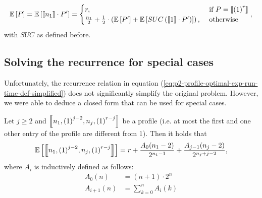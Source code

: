 \begin{equation}
  \label{eq:p2-profile-optimal-exp-run-time-def-simplified}
  \mathbb{E}\left[ P \right] =
  \mathbb{E}\left[ \left\llbracket n_1 \right\rrbracket \cdot P' \right] =
  \begin{cases}
    r, & \text{ if } P= \left\llbracket {(1)}^{r} \right\rrbracket \\
    \frac{n_1}{2} + \frac{1}{2} \cdot \left( \mathbb{E}\left[ P' \right] + \mathbb{E}\left[ SUC\left(\left\llbracket 1 \right\rrbracket\cdot P'\right) \right] \right) ,& \text{ otherwise } \\
  \end{cases},
\end{equation}
with $SUC$ as defined before. 

\subsection{Solving the recurrence for special cases}
\label{sec:p2-profile-exp-runtime-closed-form-spec-cases}

Unfortunately, the recurrence relation in equation (\ref{eq:p2-profile-optimal-exp-run-time-def-simplified}) does not significantly simplify the original problem. However, we were able to deduce a closed form that can be used for special cases.

\begin{theorem}
  \label{theo:simple-profiles-exp-runtime-for-p2-hlf}
  Let $j\geq 2$ and $\left\llbracket n_1,{(1)}^{j-2},n_j,{(1)}^{r-j} \right\rrbracket$ be a profile 
  (i.e. at most the first and one other entry of the profile are different from 1).
  Then it holds that
  \begin{equation*}
    \mathbb{E}\left[ \left\llbracket n_1,{(1)}^{j-2},n_j,{(1)}^{r-j} \right\rrbracket \right] = 
    r + \frac{A_0(n_1-2)}{2^{n_1-1}} + \frac{A_{j-1}(n_j-2)}{2^{n_j+j-2}},
  \end{equation*}
  where $A_i$ is inductively defined as follows:
  \begin{align*}
    A_0(n) & = (n+1) \cdot 2^n \\
    A_{i+1}(n) & = \sum_{k=0}^n A_{i}(k)
  \end{align*}
\end{theorem}

